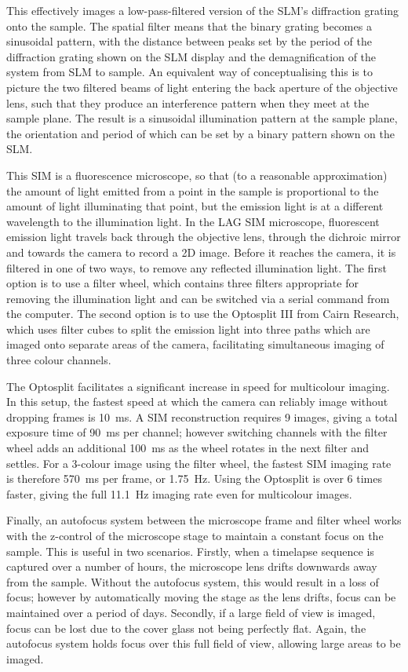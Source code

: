 This effectively images a low-pass-filtered version of the SLM's diffraction grating onto the sample. 
The spatial filter means that the binary grating becomes a sinusoidal pattern, with the distance between peaks set by the period of the diffraction grating shown on the SLM display and the demagnification of the system from SLM to sample. 
An equivalent way of conceptualising this is to picture the two filtered beams of light entering the back aperture of the objective lens, such that they produce an interference pattern when they meet at the sample plane. 
The result is a sinusoidal illumination pattern at the sample plane, the orientation and period of which can be set by a binary pattern shown on the SLM. 

This SIM is a fluorescence microscope, so that (to a reasonable approximation) the amount of light emitted from a point in the sample is proportional to the amount of light illuminating that point, but the emission light is at a different wavelength to the illumination light. 
In the LAG SIM microscope, fluorescent emission light travels back through the objective lens, through the dichroic mirror and towards the camera to record a 2D image. 
Before it reaches the camera, it is filtered in one of two ways, to remove any reflected illumination light.
The first option is to use a filter wheel, which contains three filters appropriate for removing the illumination light and can be switched via a serial command from the computer. 
The second option is to use the Optosplit III from Cairn Research, which uses filter cubes to split the emission light into three paths which are imaged onto separate areas of the camera, facilitating simultaneous imaging of three colour channels.

The Optosplit facilitates a significant increase in speed for multicolour imaging. 
In this setup, the fastest speed at which the camera can reliably image without dropping frames is \SI{10}{\milli\second}. 
A SIM reconstruction requires 9 images, giving a total exposure time of \SI{90}{\milli\second} per channel; however switching channels with the filter wheel adds an additional \SI{100}{\milli\second} as the wheel rotates in the next filter and settles. 
For a 3-colour image using the filter wheel, the fastest SIM imaging rate is therefore \SI{570}{\milli\second} per frame, or \SI{1.75}{\hertz}. 
Using the Optosplit is over 6 times faster, giving the full \SI{11.1}{\hertz} imaging rate even for multicolour images.

Finally, an autofocus system between the microscope frame and filter wheel works with the z-control of the microscope stage to maintain a constant focus on the sample. 
This is useful in two scenarios. 
Firstly, when a timelapse sequence is captured over a number of hours, the microscope lens drifts downwards away from the sample. 
Without the autofocus system, this would result in a loss of focus; however by automatically moving the stage as the lens drifts, focus can be maintained over a period of days.
Secondly, if a large field of view is imaged, focus can be lost due to the cover glass not being perfectly flat. 
Again, the autofocus system holds focus over this full field of view, allowing large areas to be imaged. 


